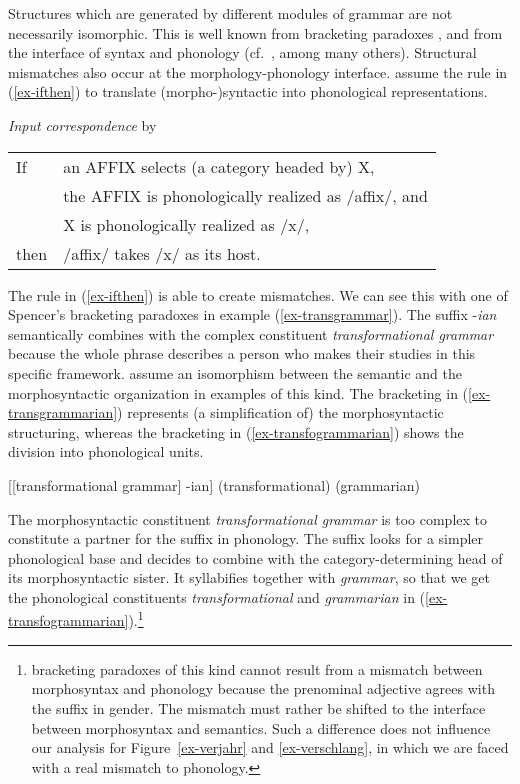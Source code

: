 \documentclass[output=paper
  ,nobabel
  ,draftmode
  ,colorlinks, citecolor=brown
]{langscibook}
\begin{document}
Structures which are generated by different modules of grammar are not necessarily isomorphic. This is well known from bracketing paradoxes \citep[cf.\ e.g.][]{Spencer1988}, and from the interface of syntax and phonology (cf.\ \cite{Shattuck-HufnagelTurk1996}, among many others). Structural mismatches also occur at the morphology-phonology interface. \citet{AckemaNeeleman2007} assume the rule in (\ref{ex-ifthen}) to translate (morpho-)syntactic into phonological representations.

\ea\emph{Input correspondence} by \citet[344]{AckemaNeeleman2007}\label{ex-ifthen}
\begin{tabular}{@{}ll}
	If &an AFFIX selects (a category headed by) X,\\
	& the AFFIX is phonologically realized as /affix/, and\\
	& X is phonologically realized as /x/,\\
	then & /affix/ takes /x/ as its host.	
\end{tabular}
\z

\begin{sloppypar}
\noindent 
The rule in (\ref{ex-ifthen}) is able to create mismatches. We can see this with one of Spencer's bracketing paradoxes in example (\ref{ex-transgrammar}). The suffix -\emph{ian} semantically combines with the complex constituent \emph{transformational grammar} because the whole phrase describes a person who makes their studies in this specific framework. \citet{AckemaNeeleman2007} assume an isomorphism between the semantic and the morphosyntactic organization in examples of this kind. The bracketing in (\ref{ex-transgrammarian}) represents (a simplification of) the morphosyntactic structuring, whereas the bracketing in (\ref{ex-transfogrammarian}) shows the division into phonological units.
\end{sloppypar}

\eal\label{ex-transgrammar}
\ex\label{ex-transgrammarian}
{[[transformational grammar] -ian]}
\ex\label{ex-transfogrammarian}
(transformational) (grammarian)
\zl

\noindent The morphosyntactic constituent \emph{transformational grammar} is too complex to constitute a partner for the suffix in phonology. The suffix looks for a simpler phonological base and decides to combine with the category-determining head of its morphosyntactic sister. It syllabifies together with \emph{grammar}, so that we get the phonological constituents \emph{transformational} and \emph{grammarian} in (\ref{ex-transfogrammarian}).\footnote{ bracketing paradoxes of this kind cannot result from a mismatch between morphosyntax and phonology because the prenominal adjective agrees with the suffix in gender. The mismatch must rather be shifted to the interface between morphosyntax and semantics. Such a difference does not influence our analysis for Figure~\ref{ex-verjahr} and \ref{ex-verschlang}, in which we are faced with a real mismatch to phonology.}
\end{document}
